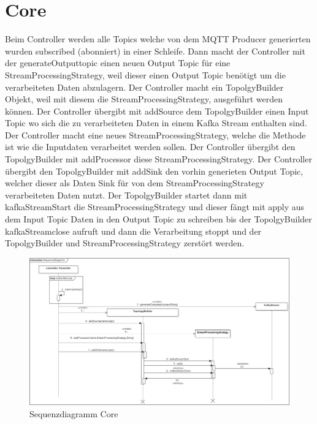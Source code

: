 \section{Core}
Beim Controller werden alle Topics welche von dem MQTT Producer generierten wurden subscribed (abonniert) in einer Schleife. Dann macht der Controller mit der generateOutputtopic einen neuen Output Topic für eine StreamProcessingStrategy, weil dieser einen Output Topic benötigt um die verarbeiteten Daten abzulagern.
Der Controller macht ein TopolgyBuilder Objekt, weil mit diesem die StreamProcessingStrategy, ausgeführt werden können. Der Controller übergibt mit addSource dem TopolgyBuilder einen Input Topic wo sich die zu verarbeiteten Daten in einem Kafka Stream enthalten sind. 
Der Controller macht eine neues StreamProcessingStrategy, welche die Methode ist wie die Inputdaten verarbeitet werden sollen. Der Controller übergibt den TopolgyBuilder mit addProcessor diese StreamProcessingStrategy.
Der Controller übergibt den TopolgyBuilder mit addSink den vorhin generieten Output Topic, welcher dieser als Daten Sink für von dem StreamProcessingStrategy verarbeiteten Daten nutzt. 
Der TopolgyBuilder startet dann mit kafkaStreamStart die StreamProcessingStrategy und dieser fängt mit apply aus dem Input Topic Daten in den Output Topic zu schreiben bis der TopolgyBuilder kafkaStreamclose aufruft und dann die Verarbeitung stoppt und der TopolgyBuilder und StreamProcessingStrategy zerstört werden.
\begin{figure}[!hbp]
	\centering
	\includegraphics[width=\linewidth]{images/core/CoreSequenceDiagram.png}
	\caption{Sequenzdiagramm Core}
\end{figure}
\newpage

